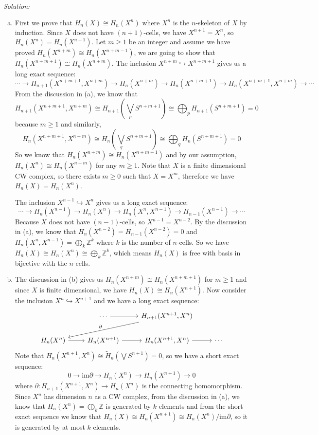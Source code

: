 \documentclass[a4paper, 12pt]{article}
\newenvironment{solution}
    {\textit{Solution:}}
    {}
\begin{document}
\begin{solution}
\begin{enumerate}[(a)]
\item First we prove that \(H_n(X)\cong H_n(X^n)\) where \(X^n\) is the \(n\)-skeleton of \(X\) by induction. Since \(X\) does not have \((n+1)\)-cells, we have \(X^{n+1}=X^n\), so \(H_n(X^n)=H_n(X^{n+1})\). Let \(m\geq 1\) be an integer and 
      assume we have proved \(H_n(X^{n+m})\cong H_n(X^{n+m-1})\), we are going to show that \(H_n(X^{n+m+1})\cong H_n(X^{n+m})\). The inclusion \(X^{n+m}\hookrightarrow X^{n+m+1}\) gives us a long exact sequence:
	  \[\cdots\rightarrow H_{n+1}(X^{n+m+1},X^{n+m})\rightarrow H_n(X^{n+m})\rightarrow H_n(X^{n+m+1})\rightarrow H_n(X^{n+m+1},X^{n+m})\rightarrow \cdots\]
	  From the discussion in (a), we know that 
	  \[H_{n+1}(X^{n+m+1},X^{n+m})\cong H_{n+1}(\bigvee_p S^{n+m+1})\cong \bigoplus_p H_{n+1}(S^{n+m+1})=0\]
	  because \(m\geq 1\) and similarly,
	  \[H_n(X^{n+m+1},X^{n+m})\cong H_n(\bigvee_q S^{n+m+1})\cong \bigoplus_q H_n(S^{n+m+1})=0\] 
      So we know that \(H_n(X^{n+m})\cong H_n(X^{n+m+1})\) and by our assumption, \(H_n(X^n)\cong H_n(X^{n+m})\) for any \(m\geq 1\). Note that \(X\) is a finite dimensional CW complex, so there exists \(m\geq 0\) such that \(X=X^m\), therefore we 
	  have \(H_n(X)=H_n(X^n)\).
	\par 
	The inclusion \(X^{n-1}\hookrightarrow X^n\) gives us a long exact sequence:
	\[\cdots\rightarrow H_n(X^{n-1})\rightarrow H_n(X^n)\rightarrow H_n(X^n,X^{n-1})\rightarrow H_{n-1}(X^{n-1})\rightarrow \cdots\]
	Because \(X\) does not have \((n-1)\)-cells, so \(X^{n-1}=X^{n-2}\). By the discussion in (a), we know that \(H_n(X^{n-2})=H_{n-1}(X^{n-2})=0\) and \(H_n(X^n,X^{n-1})=\bigoplus_k \mathbb{Z}^k\) where \(k\) is the number of \(n\)-cells. So we have 
	\(H_n(X)\cong H_n(X^n)\cong \bigoplus_k \mathbb{Z}^k\), which means \(H_n(X)\) is free with basis in bijective with the \(n\)-cells.
\item The discussion in (b) gives us \(H_n(X^{n+m})\cong H_n(X^{n+m+1})\) for \(m\geq 1\) and since \(X\) is finite dimensional, we have \(H_n(X)\cong H_n(X^{n+1})\). Now consider the inclusion \(X^n\hookrightarrow X^{n+1}\) and we have a long exact sequence:
      \[\begin{tikzcd}
	& \cdots & {H_{n+1}(X^{n+1},X^n)} \\
	{H_n(X^n)} & {H_n(X^{n+1})} & {H_n(X^{n+1},X^n)} & \cdots
	\arrow[from=1-2, to=1-3]
	\arrow["\partial"', from=1-3, to=2-1]
	\arrow[from=2-1, to=2-2]
	\arrow[from=2-2, to=2-3]
	\arrow[from=2-3, to=2-4]
\end{tikzcd}\]
Note that \(H_n(X^{n+1},X^n)\cong \tilde{H}_n(\bigvee S^{n+1})=0\), so we have a short exact sequence:
\[0\rightarrow \text{im}\partial \rightarrow H_n(X^n)\rightarrow H_n(X^{n+1})\rightarrow 0\]
where \(\partial:H_{n+1}(X^{n+1},X^n)\rightarrow H_n(X^n)\) is the connecting homomorphism. Since \(X^n\) has dimension \(n\) as a CW complex, from the discussion in (a), we know that \(H_n(X^n)=\bigoplus_k \mathbb{Z}\) is generated by \(k\) elements and from the 
short exact sequence we know that \(H_n(X)\cong H_n(X^{n+1})\cong H_n(X^n)/\text{im}\partial\), so it is generated by at most \(k\) elements.
\end{enumerate}
\end{solution}
\end{document}
